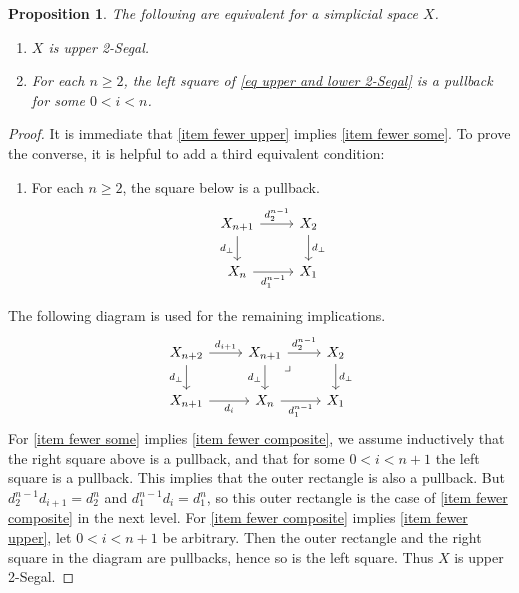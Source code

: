 \documentclass{conm-p-l}
\newtheorem{proposition}[theorem]{Proposition}
\theoremstyle{definition}
\theoremstyle{remark}
\newcommand{\op}{\textup{op}}
\begin{document}
\begin{proposition}\label{prop fewer squares}
The following are equivalent for a simplicial space $X$.
\begin{enumerate}
\item $X$ is upper 2-Segal.\label{item fewer upper}
\item For each $n\geq 2$, the left square of \eqref{eq upper and lower 2-Segal} is a pullback for some $0 < i < n$.\label{item fewer some}
\end{enumerate}
\end{proposition}
\begin{proof}
It is immediate that \eqref{item fewer upper} implies \eqref{item fewer some}.
To prove the converse, it is helpful to add a third equivalent condition:
\begin{enumerate}[start=3]
\item For each $n\geq 2$, the square below is a pullback.\label{item fewer composite}
\[ \begin{tikzcd}
X_{n+1} \rar{d_2^{n-1}} \dar[swap]{d_\bot} & X_2 \dar{d_\bot} \\
X_n \rar[swap]{d_1^{n-1}} & X_1
\end{tikzcd} \]
\end{enumerate}
The following diagram is used for the remaining implications.
\[ \begin{tikzcd}
X_{n+2} \rar{d_{i+1}} \dar[swap]{d_\bot} &
X_{n+1} \rar{d_2^{n-1}} \dar[swap]{d_\bot} \ar[dr, phantom, "\lrcorner" very near start] & X_2 \dar{d_\bot}
\\
X_{n+1} \rar[swap]{d_i} & 
X_n \rar[swap]{d_1^{n-1}} & X_1
\end{tikzcd} \]
For \eqref{item fewer some} implies \eqref{item fewer composite}, we assume inductively that the right square above is a pullback, and that for some $0 < i < n+1$ the left square is a pullback. 
This implies that the outer rectangle is also a pullback.
But $d_2^{n-1}d_{i+1} = d_2^n$ and $d_1^{n-1}d_i = d_1^n$, so this outer rectangle is the case of \eqref{item fewer composite} in the next level.
For \eqref{item fewer composite} implies \eqref{item fewer upper}, let $0 < i < n+1$ be arbitrary. 
Then the outer rectangle and the right square in the diagram are pullbacks, hence so is the left square.
Thus $X$ is upper 2-Segal.
\end{proof}

\end{document}
